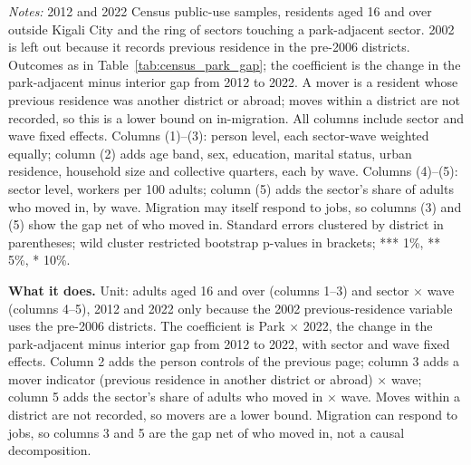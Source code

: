 \documentclass[11pt]{article}
\begin{document}
\begin{table}[H]
\begin{minipage}{0.95\textwidth}
\textit{Notes:} 2012 and 2022 Census public-use samples, residents aged 16 and over outside Kigali City and the ring of sectors touching a park-adjacent sector. 2002 is left out because it records previous residence in the pre-2006 districts. Outcomes as in Table~\ref{tab:census_park_gap}; the coefficient is the change in the park-adjacent minus interior gap from 2012 to 2022. A mover is a resident whose previous residence was another district or abroad; moves within a district are not recorded, so this is a lower bound on in-migration. All columns include sector and wave fixed effects. Columns (1)--(3): person level, each sector-wave weighted equally; column (2) adds age band, sex, education, marital status, urban residence, household size and collective quarters, each by wave. Columns (4)--(5): sector level, workers per 100 adults; column (5) adds the sector's share of adults who moved in, by wave. Migration may itself respond to jobs, so columns (3) and (5) show the gap net of who moved in. Standard errors clustered by district in parentheses; wild cluster restricted bootstrap p-values in brackets; *** 1\%, ** 5\%, * 10\%.
\end{minipage}
\end{table}

\textbf{What it does.} Unit: adults aged 16 and over (columns 1--3) and sector $\times$ wave (columns 4--5), 2012 and 2022 only because the 2002 previous-residence variable uses the pre-2006 districts. The coefficient is Park $\times$ 2022, the change in the park-adjacent minus interior gap from 2012 to 2022, with sector and wave fixed effects. Column 2 adds the person controls of the previous page; column 3 adds a mover indicator (previous residence in another district or abroad) $\times$ wave; column 5 adds the sector's share of adults who moved in $\times$ wave. Moves within a district are not recorded, so movers are a lower bound. Migration can respond to jobs, so columns 3 and 5 are the gap net of who moved in, not a causal decomposition.
\end{document}
